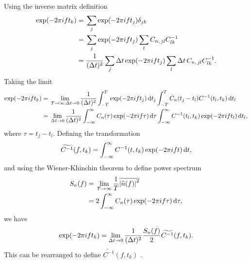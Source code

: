 Using the inverse matrix definition
\begin{align}
\exp(-2\pi i f t_k) = {} & \sum_j \exp(-2\pi ift_j) \delta_{jk} \nonumber \\
 = {} & \sum_j \exp(-2\pi ift_j) \sum_l C_{n,\,jl}C^{-1}_{lk} \nonumber \\
 = {} & \recip{(\upDelta t)^2} \sum_j \upDelta t \exp(-2\pi ift_j) \sum_l \upDelta t \, C_{n,\,jl}C^{-1}_{lk}.
\end{align}
Taking the limit
\begin{align}
\exp(-2\pi i f t_k) = {} & \lim_{T \rightarrow \infty;\upDelta t \rightarrow 0} \recip{(\upDelta t)^2} \intd{-T}{T}{\exp(-2\pi ift_j)}{t_j} \intd{-T}{T}{C_n(t_j-t_l)C^{-1}(t_l,t_k)}{t_l} \nonumber \\
 = {} & \lim_{\upDelta t \rightarrow 0} \recip{(\upDelta t)^2} \intd{-\infty}{\infty}{C_n(\tau)\exp(-2\pi if\tau)}{\tau} \intd{-\infty}{\infty}{C^{-1}(t_l,t_k)\exp(-2\pi if t_l)}{t_l},
\end{align}
where $\tau = t_j - t_l$. Defining the transformation
\begin{equation}
\widetilde{C^{-1}}(f,t_k) = \int_{-\infty}^{\infty}{C^{-1}(t,t_k)\exp(-2\pi if t)}\,\mathrm{d}{t},
\end{equation}
and using the Wiener-Khinchin theorem to define power spectrum \citep{Cutler1994}
\begin{align}
S_n(f) = {} & \lim_{T \rightarrow \infty} \frac{1}{T} \overline{\left|\widetilde{n}(f)\right|^2} \\
 = {} & 2 \int_{-\infty}^{\infty}{C_n(\tau)\exp(-2\pi i f\tau)}\,\mathrm{d}{\tau},
\end{align}
we have
\begin{equation}
\exp(-2\pi i f t_k) = \lim_{\upDelta t \rightarrow 0} \recip{(\upDelta t)^2} \frac{S_n(f)}{2} \widetilde{C^{-1}}(f,t_k).
\end{equation}
This can be rearranged to define $\widetilde{C^{-1}}(f,t_k)$ \citep{Finn1992}.

